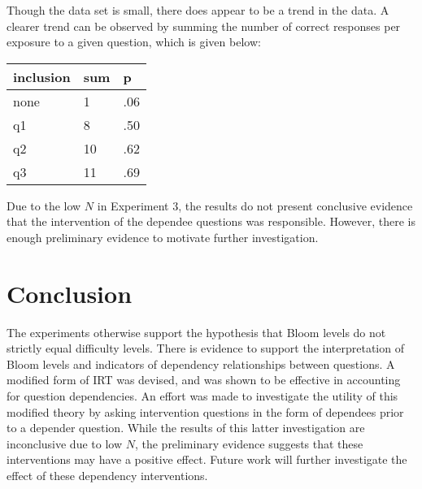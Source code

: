 \documentclass[a4paper,twocolumn]{article}
\begin{document}
Though the data set is small, there does appear to be a trend in the data. A
clearer trend can be observed by summing the number of correct responses per
exposure to a given question, which is given below:

\begin{center}
\begin{tabular}{|l|l|l|}
\hline
inclusion    & sum &  p   \\ \hline
none         &  1  & .06  \\ \hline
q1           &  8  & .50  \\ \hline
q2           & 10  & .62  \\ \hline
q3           & 11  & .69  \\ \hline
\end{tabular}
\end{center}

Due to the low $N$ in Experiment 3, the results do not present conclusive
evidence that the intervention of the dependee questions was responsible.
However, there is enough preliminary evidence to motivate further
investigation.  


\section{Conclusion}

The experiments otherwise support the hypothesis that Bloom levels do not
strictly equal difficulty levels.  There is evidence to support the
interpretation of Bloom levels and indicators of dependency relationships
between questions.  A modified form of IRT was devised, and was shown to be
effective in accounting for question dependencies.   An effort was made to
investigate the utility of this modified theory by asking intervention
questions in the form of dependees prior to a depender question.  While the
results of this latter investigation are inconclusive due to low $N$, the
preliminary evidence suggests that these interventions may have a positive
effect.  Future work will further investigate the effect of these dependency
interventions.



\end{document}

